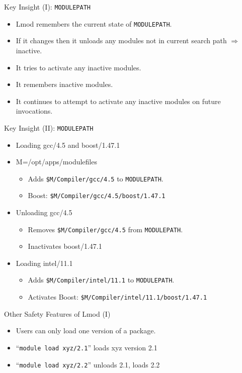 \documentclass{beamer}
\begin{document}
\begin{frame}{Key Insight (I): \texttt{MODULEPATH}}
  \begin{itemize}
    \item Lmod remembers the current state of \texttt{MODULEPATH}.
    \item If it changes then it unloads any modules not in current
      search path $\Rightarrow$ inactive.
    \item It tries to activate any inactive modules.
    \item It remembers inactive modules.
    \item It continues to attempt to activate any inactive modules on
      future invocations. 
  \end{itemize}
\end{frame}

\begin{frame}{Key Insight (II): \texttt{MODULEPATH}}
  \begin{itemize}
    \item Loading gcc/4.5 and boost/1.47.1
    \item M={\color{blue}/opt/apps/modulefiles}
      \begin{itemize}
        \item Adds \texttt{{\color{blue}\$M}/Compiler/gcc/4.5} to
          \texttt{MODULEPATH}.
        \item Boost: \texttt{{\color{blue}\$M}/Compiler/gcc/4.5/boost/1.47.1}
      \end{itemize}
    \item Unloading gcc/4.5
      \begin{itemize}
        \item Removes \texttt{{\color{blue}\$M}/Compiler/gcc/4.5}
          from \texttt{MODULEPATH}.
        \item Inactivates boost/1.47.1
      \end{itemize}
    \item Loading intel/11.1
      \begin{itemize}
        \item Adds \texttt{{\color{blue}\$M}/Compiler/intel/11.1} to
          \texttt{MODULEPATH}.
        \item Activates Boost: \texttt{{\color{blue}\$M}/Compiler/intel/11.1/boost/1.47.1}
      \end{itemize}
  \end{itemize}
\end{frame}

\begin{frame}{Other Safety Features of Lmod (I)}
  \begin{itemize}
    \item Users can only load one version of a package.
    \item ``\texttt{module load xyz/2.1}'' loads xyz version 2.1
    \item ``\texttt{module load xyz/2.2}'' unloads 2.1, loads 2.2
  \end{itemize}
\end{frame}
\end{document}
